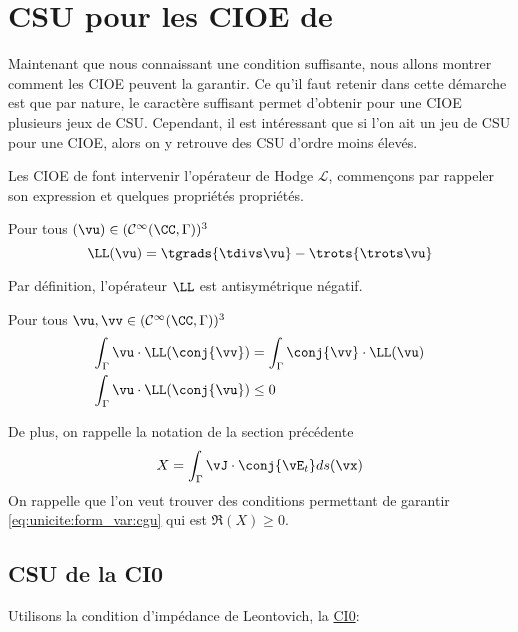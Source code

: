 \section{CSU pour les CIOE de \cite{stupfel_sufficient_2011}}

  Maintenant que nous connaissant une condition suffisante, nous allons montrer comment les CIOE peuvent la garantir. Ce qu'il faut retenir dans cette démarche est que par nature, le caractère suffisant permet d'obtenir pour une CIOE plusieurs jeux de CSU. Cependant, il est intéressant que si l'on ait un jeu de CSU pour une CIOE, alors on y retrouve des CSU d'ordre moins élevés.

  Les CIOE de \cite{stupfel_sufficient_2011} font intervenir l'opérateur de Hodge \(\mathcal{L}\), commençons par rappeler son expression et quelques propriétés propriétés.

  \begin{defn}
    Pour tous \((\vu) \in (\mathcal C^\infty(\CC,\Gamma))^3\)
    \begin{equation}
      \LL(\vu) = \tgrads{\tdivs \vu} - \trots{\trots \vu}
    \end{equation}
  \end{defn}

  \begin{prop}
    Par définition, l’opérateur \(\LL\) est antisymétrique négatif.

    Pour tous \(\vu,\vv \in (\mathcal C^\infty(\CC,\Gamma))^3\)
    \begin{align}
      \int_\Gamma \vu\cdot \LL(\conj{\vv}) &= \int_\Gamma \conj{\vv}\cdot \LL(\vu)
      \\
      \int_\Gamma \vu\cdot \LL(\conj{\vu}) &\le 0
    \end{align}
  \end{prop}

  De plus, on rappelle la notation de la section précédente
  \begin{equation}
    X = \int_\Gamma \vJ \cdot \conj{\vE_t} ds(\vx)
  \end{equation}
  On rappelle que l'on veut trouver des conditions permettant de garantir \eqref{eq:unicite:form_var:cgu} qui est \(\Re(X)\ge0\).

  \subsection{CSU de la CI0}
    Utilisons la condition d’impédance de Leontovich, la \hyperlink{ci0}{CI0}:

